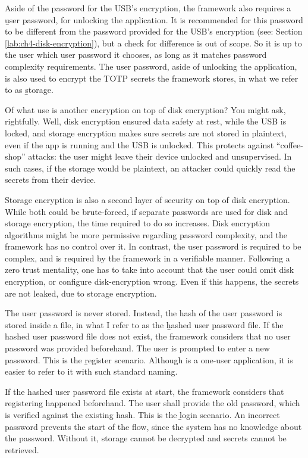 Aside of the password for the USB's encryption, the framework also requires a \b{user password}, for unlocking the application.
It is recommended for this password to be different from the password provided for the USB's encryption (see: Section \ref{lab:ch4-disk-encryption}), but a check for difference is out of scope.
So it is up to the user which user password it chooses, as long as it matches password complexity requirements.
The user password, aside of unlocking the application, is also used to encrypt the TOTP secrets the framework stores, in what we refer to as \b{storage}.

Of what use is another encryption on top of disk encryption?
You might ask, rightfully.
Well, disk encryption ensured data safety at rest, while the USB is locked, and storage encryption makes sure secrets are not stored in plaintext, even if the app is running and the USB is unlocked.
This protects against ``coffee-shop'' attacks: the user might leave their device unlocked and unsupervised.
In such cases, if the storage would be plaintext, an attacker could quickly read the secrets from their device.

Storage encryption is also a second layer of security on top of disk encryption.
While both could be brute-forced, if separate passwords are used for disk and storage encryption, the time required to do so increases.
Disk encryption algorithms might be more permissive regarding password complexity, and the framework has no control over it.
In contrast, the user password is required to be complex, and is required by the framework in a verifiable manner.
Following a zero trust mentality, one has to take into account that the user could omit disk encryption, or configure disk-encryption wrong.
Even if this happens, the secrets are not leaked, due to storage encryption.

The user password is never stored.
Instead, the hash of the user password is stored inside a file, in what I refer to as the \b{hashed user password file}.
If the hashed user password file does not exist, the framework considers that no user password was provided beforehand.
The user is prompted to enter a new password.
This is the \b{register scenario}.
Although \app{} is a one-user application, it is easier to refer to it with such standard naming.

If the hashed user password file exists at start, the framework considers that registering happened beforehand.
The user shall provide the old password, which is verified against the existing hash.
This is the \b{login scenario}.
An incorrect password prevents the start of the flow, since the system has no knowledge about the password.
Without it, storage cannot be decrypted and secrets cannot be retrieved.


